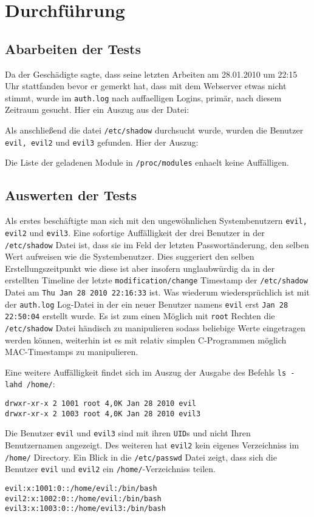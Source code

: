 \section{Durchführung}
\subsection{Abarbeiten der Tests}
Da der Geschädigte sagte, dass seine letzten Arbeiten am 28.01.2010 um 22:15 Uhr stattfanden bevor er gemerkt hat, dass mit dem Webserver etwas nicht stimmt, wurde im \texttt{auth.log} nach auffaelligen Logins, primär, nach diesem Zeitraum gesucht.
Hier ein Auszug aus der Datei:
\lstset{basicstyle=\footnotesize, breaklines=true, breakatwhitespace=true}


Als anschließend die datei \texttt{/etc/shadow} durchsucht wurde, wurden die Benutzer \texttt{evil, evil2} und \texttt{evil3} gefunden. Hier der Auszug:
%

Die Liste der geladenen Module in \texttt{/proc/modules} enhaelt keine Auffälligen.
\pagebreak
\subsection{Auswerten der Tests}
Als erstes beschäftigte man sich mit den ungewöhnlichen Systembenutzern \texttt{evil, evil2} und \texttt{evil3}. Eine sofortige Auffälligkeit der drei Benutzer in der \texttt{/etc/shadow} Datei ist, dass sie im Feld der letzten Passwortänderung, den selben Wert aufweisen wie die Systembenutzer. Dies suggeriert den selben Erstellungszeitpunkt wie diese ist aber insofern unglaubwürdig da in der erstellten Timeline der letzte \texttt{modification/change} Timestamp der \texttt{/etc/shadow} Datei am \texttt{Thu Jan 28 2010 22:16:33} ist. Was wiederum wiedersprüchlich ist mit der \texttt{auth.log} Log-Datei in der ein neuer Benutzer namens \texttt{evil} erst \texttt{Jan 28 22:50:04} erstellt wurde. Es ist zum einen Möglich mit \texttt{root} Rechten die \texttt{/etc/shadow} Datei händisch zu manipulieren sodass beliebige Werte eingetragen werden können, weiterhin ist es mit relativ simplen C-Programmen möglich MAC-Timestamps zu manipulieren.

Eine weitere Auffälligkeit findet sich im Auszug der Ausgabe des Befehls \texttt{ls -lahd /home/}:
\begin{verbatim}
drwxr-xr-x 2 1001 root 4,0K Jan 28 2010 evil
drwxr-xr-x 2 1003 root 4,0K Jan 28 2010 evil3
\end{verbatim}
Die Benutzer \texttt{evil} und \texttt{evil3} sind mit ihren \texttt{UID}s und nicht Ihren Benutzernamen angezeigt. Des weiteren hat \texttt{evil2} kein eigenes Verzeichniss im \texttt{/home/} Directory. Ein Blick in die \texttt{/etc/passwd} Datei zeigt, dass sich die Benutzer \texttt{evil} und \texttt{evil2} ein \texttt{/home/}-Verzeichniss teilen.
\begin{verbatim}
evil:x:1001:0::/home/evil:/bin/bash
evil2:x:1002:0::/home/evil:/bin/bash
evil3:x:1003:0::/home/evil3:/bin/bash
\end{verbatim}

